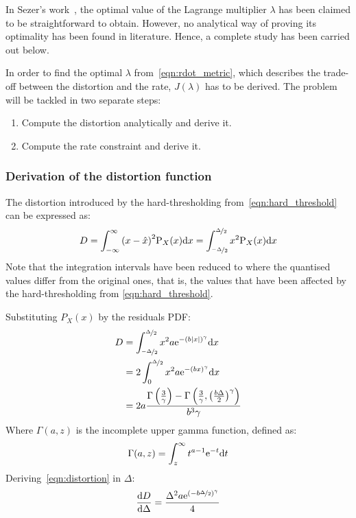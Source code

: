 \documentclass[11pt,a4paper,openright,twoside]{book}
\numberwithin{equation}{section} %
\numberwithin{figure}{section} %
\numberwithin{table}{section} %
\begin{document}
In Sezer's work~\cite{sezer-11-phd,sezer-08-sparse-orthonormal-transforms},
the optimal value of the Lagrange multiplier $\lambda$ has been claimed
to be straightforward to obtain.
However, no analytical way of proving its optimality has been found in
literature.
Hence, a complete study has been carried out below.

In order to find the optimal $\lambda$ from~\eqref{eqn:rdot_metric},
which describes the trade-off between the distortion and the rate,
$J(\lambda)$ has to be derived.
The problem will be tackled in two separate steps:
\begin{enumerate}
	\item Compute the distortion analytically and derive it.
	\item Compute the rate constraint and derive it.
\end{enumerate}

\subsubsection{Derivation of the distortion function}
\label{ssub:derivation_of_the_distortion_function}

The distortion introduced by the hard-thresholding
from~\eqref{eqn:hard_threshold} can be expressed as:
\begin{equation}
	D
	= \int_{-\infty}^{\infty} {(x - \hat x)}^2 \text{P}_X (x)\text{d} x
	= \int_{\nicefrac{-\Delta}{2}}^{\nicefrac{\Delta}{2}}
	\label{eqn:int_distortion}
	x^2\text{P}_X (x) \text{d} x
\end{equation}
Note that the integration intervals have been reduced to where the
quantised values differ from the original ones, that is, the values that
have been affected by the hard-thresholding from
\eqref{eqn:hard_threshold}.

Substituting $P_X(x)$ by the residuals \ac{PDF}:
\begin{align}
	D
	&=\int_{\nicefrac{-\Delta}{2}}^{\nicefrac{\Delta}{2}}
	x^2 a \text{e}^{-{\left(b\vert x \vert\right)}^\gamma} \text{d} x \\
	&=2 \int_0^{\nicefrac{\Delta}{2}}
	x^2 a \text{e}^{-{\left(b x \right)}^\gamma} \text{d} x\\
	&=
		2a \frac{\Gamma\left(\frac{3}{\gamma}\right)-
		\Gamma\left(
		\frac{3}{\gamma},{\left(\frac{b\Delta}{2}\right)}^\gamma
		\right)}{b^3\gamma}
	\label{eqn:distortion}
\end{align}
Where $\Gamma(a,z)$ is the incomplete upper gamma function, defined as:
\begin{equation}
	\Gamma(a,z)=\int_z^\infty t^{a-1}\text{e}^{-t}\text{d} t
\end{equation}
Deriving~\eqref{eqn:distortion} in $\Delta$:
\begin{equation}
	\frac{\text{d} D}{\text{d}\Delta} =
	\frac{\Delta^2 a \text{e}^{{(-b\nicefrac{\Delta}{2})}^\gamma}}{4}
	\label{eqn:diff_distortion}
\end{equation}
\end{document}

